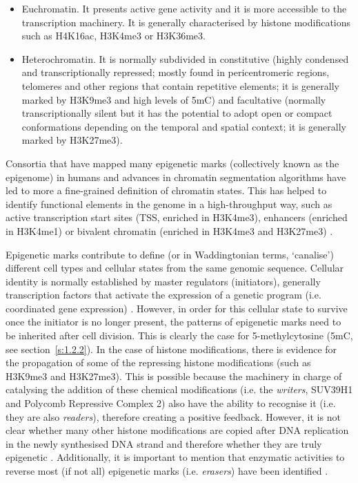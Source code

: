 \begin{itemize}
	
	\item Euchromatin. It presents active gene activity and it is more accessible to the transcription machinery. It is generally characterised by histone modifications such as H4K16ac, H3K4me3 or H3K36me3.
	
	\item Heterochromatin. It is normally subdivided in constitutive (highly condensed and transcriptionally repressed; mostly found in pericentromeric regions, telomeres and other regions that contain repetitive elements; it is generally marked by H3K9me3 and high levels of \acrshort{5mC}) and facultative (normally transcriptionally silent but it has the potential to adopt open or compact conformations depending on the temporal and spatial context; it is generally marked by H3K27me3).
	
\end{itemize}

Consortia that have mapped many epigenetic marks (collectively known as the epigenome) in humans \cite{Consortium2012, Consortium2015} and advances in chromatin segmentation algorithms \cite{Ernst2010} have led to more a fine-grained definition of chromatin states. This has helped to identify functional elements in the genome in a high-throughput way, such as active transcription start sites (\acrshort{TSS}, enriched in H3K4me3), enhancers (enriched in H3K4me1) or bivalent chromatin (enriched in H3K4me3 and H3K27me3) \cite{Consortium2012, Consortium2015}. 

\bigskip

Epigenetic marks contribute to define (or in Waddingtonian terms, `canalise') different cell types and cellular states from the same genomic sequence. Cellular identity is normally established by master regulators (initiators), generally transcription factors that activate the expression of a genetic program (i.e. coordinated gene expression) \cite{Reinberg2018}. However, in order for this cellular state to survive once the initiator is no longer present, the patterns of epigenetic marks need to be inherited after cell division. This is clearly the case for 5-methylcytosine (\acrshort{5mC}, see section~\ref{s:1.2.2}). In the case of histone modifications, there is evidence for the propagation of some of the repressing histone modifications (such as H3K9me3 and H3K27me3). This is possible because the machinery in charge of catalysing the addition of these chemical modifications (i.e. the \textit{writers}, SUV39H1 and Polycomb Repressive Complex 2) also have the ability to recognise it (i.e. they are also \textit{readers}), therefore creating a positive feedback. However, it is not clear whether many other histone modifications are copied after DNA replication in the newly synthesised DNA strand and therefore whether they are truly epigenetic \cite{Reinberg2018}. Additionally, it is important to mention that enzymatic activities to reverse most (if not all) epigenetic marks (i.e. \textit{erasers}) have been identified \cite{Allis2016}.


